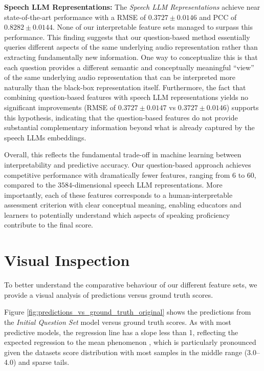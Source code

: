 \documentclass{report}
\begin{document}
\textbf{Speech LLM Representations:} The \emph{Speech LLM Representations} achieve near state-of-the-art performance with a RMSE of $0.3727 \pm 0.0146$ and PCC of $0.8282 \pm 0.0144$. None of our interpretable feature sets managed to surpass this performance. This finding suggests that our question-based method essentially queries different aspects of the same underlying audio representation rather than extracting fundamentally new information. One way to conceptualize this is that each question provides a different semantic and conceptually meaningful ``view'' of the same underlying audio representation that can be interpreted more naturally than the black-box representation itself. Furthermore, the fact that combining question-based features with speech LLM representations yields no significant improvements (RMSE of $0.3727 \pm 0.0147$ vs $0.3727 \pm 0.0146$) supports this hypothesis, indicating that the question-based features do not provide substantial complementary information beyond what is already captured by the speech LLMs embeddings.

Overall, this reflects the fundamental trade-off in machine learning between interpretability and predictive accuracy. Our question-based approach achieves competitive performance with dramatically fewer features, ranging from 6 to 60, compared to the $3584$-dimensional speech LLM representations. More importantly, each of these features corresponds to a human-interpretable assessment criterion with clear conceptual meaning, enabling educators and learners to potentially understand which aspects of speaking proficiency contribute to the final score.

\section{Visual Inspection}
\label{sec:visual_inspection}
To better understand the comparative behaviour of our different feature sets, we provide a visual analysis of predictions versus ground truth scores.

Figure \ref{fig:predictions_vs_ground_truth_original} shows the predictions from the \emph{Initial Question Set} model versus ground truth scores. As with most predictive models, the regression line has a slope less than 1, reflecting the expected regression to the mean phenomenon \citep{galton_1886_1449548}, which is particularly pronounced given the datasets score distribution with most samples in the middle range (3.0–4.0) and sparse tails.
\end{document}
